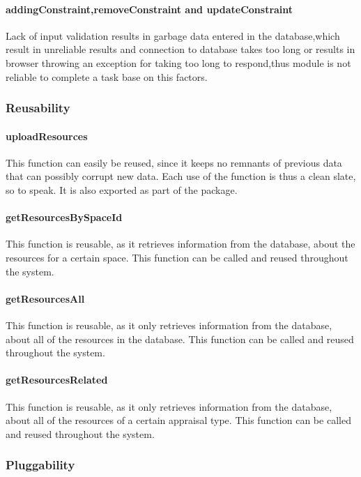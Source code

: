 \documentclass[a4paper]{article}
\begin{document}
\paragraph{addingConstraint,removeConstraint and updateConstraint}
Lack of input validation results in garbage data entered in the database,which result in unreliable results and connection to database takes too long or results in browser throwing an exception for taking too long to respond,thus module is not reliable to complete a task base on this factors.


\subsubsection {Reusability}

\paragraph{uploadResources}
This function can easily be reused, since it keeps no remnants of previous data that can possibly corrupt new data. Each use of the function is thus a clean slate, so to speak. It is also exported as part of the package.

\paragraph{getResourcesBySpaceId}
This function is reusable, as it retrieves information from the database, about the resources for a certain space. This function can be called and reused throughout the system.

\paragraph{getResourcesAll}
This function is reusable, as it only retrieves information from the database, about all of the resources in the database. This function can be called and reused throughout the system.

\paragraph{getResourcesRelated}
This function is reusable, as it only retrieves information from the database, about all of the resources of a certain appraisal type. This function can be called and reused throughout the system.

\subsubsection {Pluggability}
\end{document}
